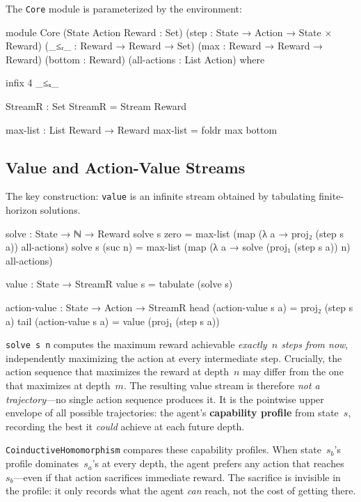 \documentclass[runningheads]{llncs}
\begin{document}
The \texttt{Core} module is parameterized by the environment:

\begin{code}[hide]
module Core
  (State Action Reward : Set)
  (step                : State → Action → State × Reward)
  (_≤ᵣ_                : Reward → Reward → Set)
  (max                 : Reward → Reward → Reward)
  (bottom              : Reward)
  (all-actions         : List Action)
  where

  infix 4 _≤ₛ_

  StreamR : Set
  StreamR = Stream Reward

  max-list : List Reward → Reward
  max-list = foldr max bottom
\end{code}

\subsection{Value and Action-Value Streams}

The key construction: \texttt{value} is an infinite stream obtained by tabulating finite-horizon solutions.

\begin{code}
  solve : State → ℕ → Reward
  solve s zero    = max-list (map (λ a → proj₂ (step s a)) all-actions)
  solve s (suc n) = max-list (map (λ a → solve (proj₁ (step s a)) n) all-actions)

  value : State → StreamR
  value s = tabulate (solve s)

  action-value : State → Action → StreamR
  head (action-value s a) = proj₂ (step s a)
  tail (action-value s a) = value (proj₁ (step s a))
\end{code}

\noindent \texttt{solve~s~n} computes the maximum reward achievable \emph{exactly~$n$ steps from now}, independently maximizing the action at every intermediate step.  Crucially, the action sequence that maximizes the reward at depth~$n$ may differ from the one that maximizes at depth~$m$.  The resulting value stream is therefore \emph{not a trajectory}---no single action sequence produces it.  It is the pointwise upper envelope of all possible trajectories: the agent's \textbf{capability profile} from state~$s$, recording the best it \emph{could} achieve at each future depth.

\texttt{CoinductiveHomomorphism} compares these capability profiles.  When state~$s_b$'s profile dominates~$s_a$'s at every depth, the agent prefers any action that reaches~$s_b$---even if that action sacrifices immediate reward.  The sacrifice is invisible in the profile: it only records what the agent \emph{can} reach, not the cost of getting there.
\end{document}
